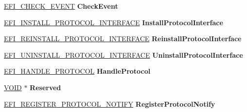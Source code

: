 \begin{DoxyCompactItemize}
\item 
\mbox{\label{struct_e_f_i___b_o_o_t___s_e_r_v_i_c_e_s_adef1c8c0506870e3767583503a4bdca3}} 
\hyperlink{_uefi_spec_8h_adf8e6c79edb3a20647fc489d22e329a2}{E\+F\+I\+\_\+\+C\+H\+E\+C\+K\+\_\+\+E\+V\+E\+NT} {\bfseries Check\+Event}
\item 
\mbox{\label{struct_e_f_i___b_o_o_t___s_e_r_v_i_c_e_s_a6669c30dc1ae9c9251d50b07207edc42}} 
\hyperlink{_uefi_spec_8h_a83a71b62d2e3a933d91031e98741aeca}{E\+F\+I\+\_\+\+I\+N\+S\+T\+A\+L\+L\+\_\+\+P\+R\+O\+T\+O\+C\+O\+L\+\_\+\+I\+N\+T\+E\+R\+F\+A\+CE} {\bfseries Install\+Protocol\+Interface}
\item 
\mbox{\label{struct_e_f_i___b_o_o_t___s_e_r_v_i_c_e_s_a61a07b1fe8af7d1ddccb25432ea350ed}} 
\hyperlink{_uefi_spec_8h_aa0bb898fa0d4c7bc2cbd9fcfd8d3f7ce}{E\+F\+I\+\_\+\+R\+E\+I\+N\+S\+T\+A\+L\+L\+\_\+\+P\+R\+O\+T\+O\+C\+O\+L\+\_\+\+I\+N\+T\+E\+R\+F\+A\+CE} {\bfseries Reinstall\+Protocol\+Interface}
\item 
\mbox{\label{struct_e_f_i___b_o_o_t___s_e_r_v_i_c_e_s_af81911b5ac0d6234971e16f51d05d7b7}} 
\hyperlink{_uefi_spec_8h_aac9720fc70eb5316876ba3d5f49ca16a}{E\+F\+I\+\_\+\+U\+N\+I\+N\+S\+T\+A\+L\+L\+\_\+\+P\+R\+O\+T\+O\+C\+O\+L\+\_\+\+I\+N\+T\+E\+R\+F\+A\+CE} {\bfseries Uninstall\+Protocol\+Interface}
\item 
\mbox{\label{struct_e_f_i___b_o_o_t___s_e_r_v_i_c_e_s_a9af04425a67660b4bf77c27fab3a1992}} 
\hyperlink{_uefi_spec_8h_a8c8282eb2f5cebea9f023efa015b5906}{E\+F\+I\+\_\+\+H\+A\+N\+D\+L\+E\+\_\+\+P\+R\+O\+T\+O\+C\+OL} {\bfseries Handle\+Protocol}
\item 
\mbox{\label{struct_e_f_i___b_o_o_t___s_e_r_v_i_c_e_s_aceae82a9941ca338aa7ad998529a9bec}} 
\hyperlink{interfacevoid}{V\+O\+ID} $\ast$ {\bfseries Reserved}
\item 
\mbox{\label{struct_e_f_i___b_o_o_t___s_e_r_v_i_c_e_s_ac63923e8964cf7983d0ec0e21f57240d}} 
\hyperlink{_uefi_spec_8h_afd363625c194ad93f8786cee87a877f7}{E\+F\+I\+\_\+\+R\+E\+G\+I\+S\+T\+E\+R\+\_\+\+P\+R\+O\+T\+O\+C\+O\+L\+\_\+\+N\+O\+T\+I\+FY} {\bfseries Register\+Protocol\+Notify}

\end{DoxyCompactItemize}
